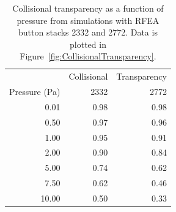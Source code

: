 \begin{table}
\centering
\caption{Collisional transparency as a function of pressure from simulations with RFEA button stacks 2332 and 2772. Data is plotted in Figure~\ref{fig:CollisionalTransparency}.}
\label{table:CollisionalTransparency}
\begin{tabular}{rrr}
  \hline
              & Collisional & Transparency \\
Pressure (Pa) & 2332 & 2772 \\ 
  \hline
0.01 & 0.98 & 0.98 \\ 
  0.50 & 0.97 & 0.96 \\ 
  1.00 & 0.95 & 0.91 \\ 
  2.00 & 0.90 & 0.84 \\ 
  5.00 & 0.74 & 0.62 \\ 
  7.50 & 0.62 & 0.46 \\ 
  10.00 & 0.50 & 0.33 \\ 
   \hline
\end{tabular}
\end{table}


